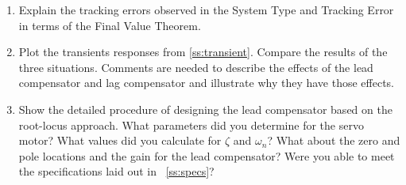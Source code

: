 \documentclass[11pt,a4paper]{article}
\begin{document}
\begin{enumerate}

\item Explain the tracking errors observed in the System Type and Tracking Error in terms of the Final Value Theorem.

\item Plot the transients responses from \ref{ss:transient}. Compare the results of the three situations. Comments are needed to describe the effects of the lead compensator and lag compensator and illustrate why they have those effects.


\item Show the detailed procedure of designing the lead compensator based on the root-locus approach. What parameters did you determine for the servo motor? What values did you calculate for $\zeta$ and $\omega_{n}$? What about the zero and pole locations and the gain for the lead compensator? Were you able to meet the specifications laid out in ~\ref{ss:specs}?




\end{enumerate}
\end{document}
